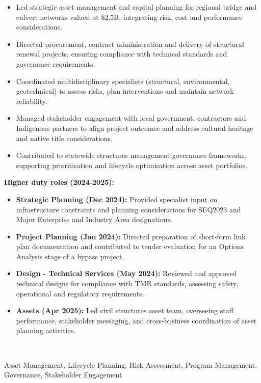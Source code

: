 \begin{experiences}
{    \begin{itemize}
    \item Led strategic asset management and capital planning for regional bridge and culvert networks valued at \$2.5B, integrating risk, cost and performance considerations.
    \item Directed procurement, contract administration and delivery of structural renewal projects, ensuring compliance with technical standards and governance requirements.
    \item Coordinated multidisciplinary specialists (structural, environmental, geotechnical) to assess risks, plan interventions and maintain network reliability.
    \item Managed stakeholder engagement with local government, contractors and Indigenous partners to align project outcomes and address cultural heritage and native title considerations.
    \item Contributed to statewide structures management governance frameworks, supporting prioritisation and lifecycle optimisation across asset portfolios.
     
    \end{itemize}
        \vspace{0.5em}
     \textbf{Higher duty roles (2024-2025):}
    \begin{itemize}
     \item \textbf{Strategic Planning (Dec 2024):} Provided specialist input on infrastructure constraints and planning considerations for SEQ2023 and Major Enterprise and Industry Area designations.
    \item \textbf{Project Planning (Jan 2024):} Directed preparation of short-form link plan documentation and contributed to tender evaluation for an Options Analysis stage of a bypass project.
    \item \textbf{Design - Technical Services (May 2024):} Reviewed and approved technical designs for compliance with TMR standards, assessing safety, operational and regulatory requirements.
    \item \textbf{Assets (Apr 2025):} Led civil structures asset team, overseeing staff performance, stakeholder messaging, and cross-business coordination of asset planning activities.
   
    \end{itemize}
    \vspace{0.5em}
    \
  }
  {Asset Management, Lifecycle Planning, Risk Assessment, Program Management, Governance, Stakeholder Engagement}


\end{experiences}
